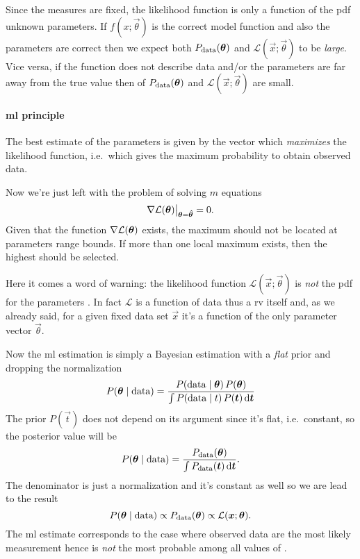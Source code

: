 \documentclass[
	10pt,
	draft
]{scrreprt}
\newcommand{\lkhd}{\ensuremath{\mathcal{L}}}
\begin{document}
Since the measures are fixed, the likelihood function is only a function of the \ac{pdf} unknown parameters.
If $f(x;\vec{\theta})$ is the correct model function and also the parameters are correct then we expect both $P_\textup{data}(\vec{\theta})$ and $\lkhd(\vec{x};\vec{\theta})$ to be \emph{large}.
Vice versa, if the function does not describe data and/or the parameters are far away from the true value then of $P_\textup{data}(\vec{\theta})$ and $\lkhd(\vec{x};\vec{\theta})$ are small.



\paragraph{\acl{ml} principle}
The best estimate of the parameters \vec{\theta} is given by the vector \vec{\hat\theta} which \emph{maximizes} the likelihood function, i.e.~which gives the maximum probability to obtain observed data.


Now we're just left with the problem of solving $m$ equations
\begin{equation}
\V\lkhd(\vec{\theta})\big\lvert_{\vec{\theta} = \vec{\hat\theta}} = 0.
\end{equation}
Given that the function $\V\lkhd(\vec{\theta})$ exists, the maximum should not be located at parameters range bounds.
If more than one local maximum exists, then the highest should be selected.




Here it comes a word of warning: the likelihood function $\lkhd(\vec{x};\vec{\theta})$ is \emph{not} the \ac{pdf} for the parameters \vec{\theta}.
In fact $\lkhd$ is a function of data thus a \ac{rv} itself and, as we already said, for a given fixed data set $\vec{x}$ it's a function of the only parameter vector $\vec{\theta}$.



Now the \ac{ml} estimation is simply a Bayesian estimation with a \emph{flat} prior and dropping the normalization
\begin{equation}
P(\vec{\theta}\mid\text{data}) = \frac{P(\textup{data}\mid\vec{\theta})\,P(\vec{\theta})}{\int P(\text{data}\mid t)\,P(\vec{t})\ud \vec{t}}
\end{equation}
The prior $P(\vec{t})$ does not depend on its argument since it's flat, i.e.~constant, so the posterior value will be
\begin{equation}
P(\vec{\theta}\mid\text{data})  = \frac{P_\textup{data}(\vec{\theta})}{\int P_\textup{data}(\vec{t})\ud \vec{t}}.
\end{equation}
The denominator is just a normalization and it's constant as well so we are lead to the result
\begin{equation}
P(\vec{\theta}\mid\text{data})\propto P_\textup{data}(\vec{\theta}) \propto \lkhd(\vec{x};\vec{\theta}).
\end{equation}
The \ac{ml} estimate \vec{\hat\theta} corresponds to the case where observed data are the most likely measurement hence \vec{\hat\theta} is \emph{not} the most probable among all values of \vec{\theta}.
\end{document}
